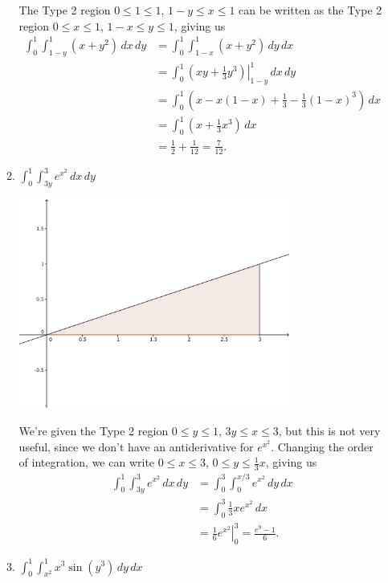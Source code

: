 \documentclass[letterpaper,12pt]{article}
\newcommand{\di}{\displaystyle}
\begin{document}
\begin{enumerate}
\begin{enumerate}
The Type 2 region $0\leq 1\leq 1$, $1-y\leq x\leq 1$ can be written as the Type 2 region $0\leq x\leq 1$, $1-x\leq y\leq 1$, giving us
\begin{align*}
 \int_0^1\int_{1-y}^1(x+y^2)\,dx\,dy & = \int_0^1\int_{1-x}^1(x+y^2)\,dy\,dx\\
& = \int_0^1\left.\left(xy+\frac{1}{3}y^3\right)\right|_{1-y}^1\,dx\,dy\\
& = \int_0^1 \left(x-x(1-x)+\frac{1}{3}-\frac{1}{3}(1-x)^3\right)\,dx\\
& = \int_0^1 \left(x+\frac{1}{3}x^3\right)\,dx\\
& = \frac{1}{2}+\frac{1}{12} = \frac{7}{12}.
\end{align*}

  \item $\di \int_0^1\int_{3y}^3 e^{x^2}\,dx\,dy$

\begin{center}
\includegraphics[width=3.5in]{Q11-4c.png} 
\end{center}

We're given the Type 2 region $0\leq y\leq 1$, $3y\leq x\leq 3$, but this is not very useful, since we don't have an antiderivative for $e^{x^2}$. Changing the order of integration, we can write $0\leq x\leq 3$, $0\leq y\leq \frac{1}{3}x$, giving us
\begin{align*}
 \int_0^1\int_{3y}^3 e^{x^2}\,dx\,dy & = \int_0^3\int_0^{x/3}e^{x^2}\,dy\,dx\\
& = \int_0^3 \frac{1}{3}xe^{x^2}\,dx\\
& = \left.\frac{1}{6}e^{x^2}\right|_0^3 = \frac{e^9-1}{6}.
\end{align*}

  \item $\di \int_0^1\int_{x^2}^1 x^3\sin(y^3)\,dy\,dx$


\end{enumerate}
\end{enumerate}
\end{document}
